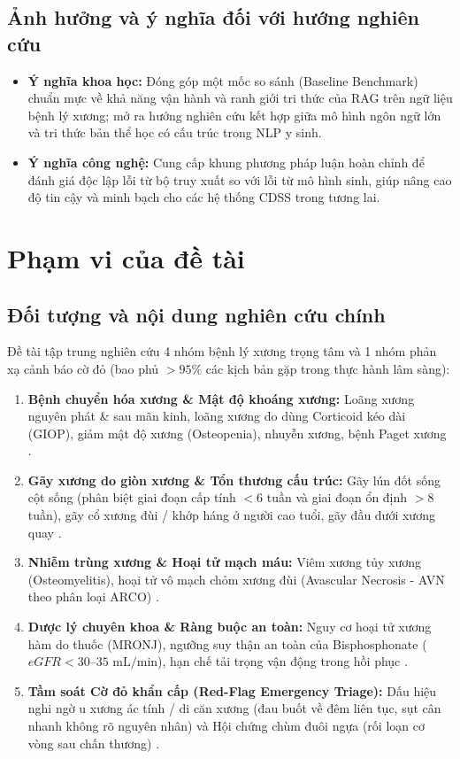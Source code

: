 \documentclass[12pt,a4paper]{article}
\begin{document}
\subsection{Ảnh hưởng và ý nghĩa đối với hướng nghiên cứu}
\begin{itemize}[leftmargin=1.27cm]
    \item \textbf{Ý nghĩa khoa học:} Đóng góp một mốc so sánh (Baseline Benchmark) chuẩn mực về khả năng vận hành và ranh giới tri thức của RAG trên ngữ liệu bệnh lý xương; mở ra hướng nghiên cứu kết hợp giữa mô hình ngôn ngữ lớn và tri thức bản thể học có cấu trúc trong NLP y sinh.
    \item \textbf{Ý nghĩa công nghệ:} Cung cấp khung phương pháp luận hoàn chỉnh để đánh giá độc lập lỗi từ bộ truy xuất so với lỗi từ mô hình sinh, giúp nâng cao độ tin cậy và minh bạch cho các hệ thống CDSS trong tương lai.
\end{itemize}

\section{Phạm vi của đề tài}

\subsection{Đối tượng và nội dung nghiên cứu chính}
Đề tài tập trung nghiên cứu 4 nhóm bệnh lý xương trọng tâm và 1 nhóm phản xạ cảnh báo cờ đỏ (bao phủ $>95\%$ các kịch bản gặp trong thực hành lâm sàng):
\begin{enumerate}[leftmargin=1.27cm, label=\arabic*.]
    \item \textbf{Bệnh chuyển hóa xương \& Mật độ khoáng xương:} Loãng xương nguyên phát \& sau mãn kinh, loãng xương do dùng Corticoid kéo dài (GIOP), giảm mật độ xương (Osteopenia), nhuyễn xương, bệnh Paget xương \cite{bhof2022guide}.
    \item \textbf{Gãy xương do giòn xương \& Tổn thương cấu trúc:} Gãy lún đốt sống cột sống (phân biệt giai đoạn cấp tính $<6$ tuần và giai đoạn ổn định $>8$ tuần), gãy cổ xương đùi / khớp háng ở người cao tuổi, gãy đầu dưới xương quay \cite{aaos2011spine, aaos2015hip}.
    \item \textbf{Nhiễm trùng xương \& Hoại tử mạch máu:} Viêm xương tủy xương (Osteomyelitis), hoại tử vô mạch chỏm xương đùi (Avascular Necrosis - AVN theo phân loại ARCO) \cite{idsa2015osteomyelitis, arco2020staging}.
    \item \textbf{Dược lý chuyên khoa \& Ràng buộc an toàn:} Nguy cơ hoại tử xương hàm do thuốc (MRONJ), ngưỡng suy thận an toàn của Bisphosphonate ($eGFR < 30$--$35\text{ mL/min}$), hạn chế tải trọng vận động trong hồi phục \cite{endocrine2020pharma, aaoms2022mronj}.
    \item \textbf{Tầm soát Cờ đỏ khẩn cấp (Red-Flag Emergency Triage):} Dấu hiệu nghi ngờ u xương ác tính / di căn xương (đau buốt về đêm liên tục, sụt cân nhanh không rõ nguyên nhân) và Hội chứng chùm đuôi ngựa (rối loạn cơ vòng sau chấn thương) \cite{nice2021sarcoma}.
\end{enumerate}
\end{document}
